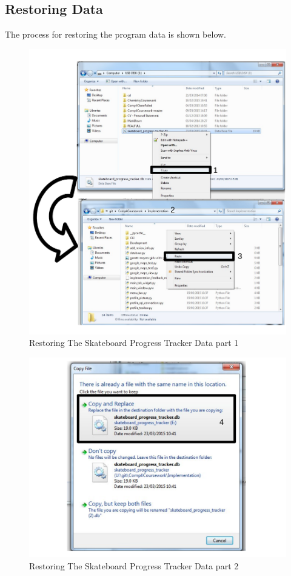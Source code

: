 \subsection{Restoring Data}

The process for restoring the program data is shown below.

\begin{figure}[H]
    \includegraphics[width=\textwidth]{./Manual/Images/RestoringData.pdf}
    \caption{Restoring The Skateboard Progress Tracker Data part 1} \label{fig:Restoring Data}
\end{figure}
\begin{figure}[H]
    \includegraphics[width=\textwidth]{./Manual/Images/RestoringData2.pdf}
    \caption{Restoring The Skateboard Progress Tracker Data part 2} \label{fig:Restoring Data2}
\end{figure}

